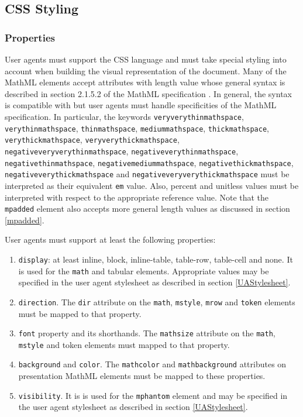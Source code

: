 \subsection{CSS Styling}

\subsubsection{Properties}\label{CSSProperties}

User agents must support the CSS language \cite{CSS2} and must take special
styling into account when building the visual representation of the document.
Many of the MathML elements accept attributes with length value whose
general syntax is described in section 2.1.5.2 of the MathML specification
\cite{MathML3}. In general,
the syntax is compatible with \cite{CSS2} but user agents must handle
specificities of the MathML specification. In particular, the keywords
{\tt veryverythinmathspace},
{\tt verythinmathspace},
{\tt thinmathspace},
{\tt mediummathspace},
{\tt thickmathspace},
{\tt verythickmathspace},
{\tt veryverythickmathspace},
{\tt negativeveryverythinmathspace},
{\tt negativeverythinmathspace},
{\tt negativethinmathspace},
{\tt negativemediummathspace},
{\tt negativethickmathspace},
{\tt negativeverythickmathspace} and
{\tt negativeveryverythickmathspace} must be interpreted as their
equivalent {\tt em} value. Also, percent and unitless values must be interpreted
with respect to the appropriate reference value. Note that the {\tt mpadded}
element also accepts more general length values as discussed in section
\ref{mpadded}.

User agents must support at least the following properties:
\begin{enumerate}
\item {\tt display}: at least inline, block, inline-table, table-row,
  table-cell and none. It is used for the {\tt math} and tabular
  elements. Appropriate values may be specified in the user agent stylesheet
  as described in section \ref{UAStylesheet}.
\item {\tt direction}. The {\tt dir} attribute on the {\tt math}, {\tt mstyle},
  {\tt mrow} and {\tt token} elements must be mapped to that property.
\item {\tt font} property and its shorthands. The {\tt mathsize} attribute on
  the {\tt math}, {\tt mstyle} and token elements must mapped to that property.
\item {\tt background} and {\tt color}. The {\tt mathcolor} and
  {\tt mathbackground} attributes on presentation MathML elements must be
  mapped to these properties.
\item {\tt visibility}. It is is used for the {\tt mphantom} element and may be
  specified in the user agent stylesheet as described in section
  \ref{UAStylesheet}.
\end{enumerate}

